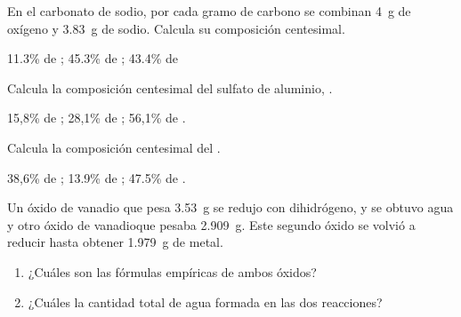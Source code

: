 \documentclass[10pt,a5paper,twoside]{article}
\begin{document}
  \begin{exercise}[
      tags    = {termodinámica, entalpía, entalpia de reacción, calor},
      topics  = {química, termoquímica, termodinámica},
      source  = {FQ 1B SAN 2015, p43, e44},
    ]
    En el carbonato de sodio, por cada gramo de carbono se combinan \SI{4}{\gram} de oxígeno y \SI{3.83}{\gram} de sodio. Calcula su composición centesimal.
  \end{exercise}

  \begin{solution}
    11.3\% de ; 45.3\% de ; 43.4\% de 
  \end{solution}




  \begin{exercise}[
      tags    = {termodinámica, entalpía, entalpia de reacción, calor},
      topics  = {química, termoquímica, termodinámica},
      source  = {FQ 1B OXF 2015, p43, e42},
    ]
    Calcula la composición centesimal del sulfato de aluminio, .
  \end{exercise}

  \begin{solution}
    15,8\% de ; 28,1\% de ; 56,1\% de .
  \end{solution}



  \begin{exercise}[
      tags    = {termodinámica, entalpía, entalpia de reacción, calor},
      topics  = {química, termoquímica, termodinámica},
      source  = {FQ 1B OXF 2015, p43, e43},
    ]
    Calcula la composición centesimal del .
  \end{exercise}

  \begin{solution}
    38,6\% de ; 13.9\% de ; 47.5\% de .
  \end{solution}




  \begin{exercise}[
      tags    = {termodinámica, entalpía, entalpia de reacción, calor},
      topics  = {química, termoquímica, termodinámica},
      source  = {FQ 1B OXF 2015, p43, e45},
    ]
    Un óxido de vanadio que pesa \SI{3,53}{\gram} se redujo con dihidrógeno, y se obtuvo agua y otro óxido de vanadioque pesaba \SI{2,909}{\gram}. Este segundo óxido se volvió a reducir hasta obtener \SI{1,979}{\gram} de metal.
    \begin{enumerate}
      \item ¿Cuáles son las fórmulas empíricas de ambos óxidos?
      \item ¿Cuáles la cantidad total de agua formada en las dos reacciones?
    \end{enumerate}
  \end{exercise}
\end{document}
